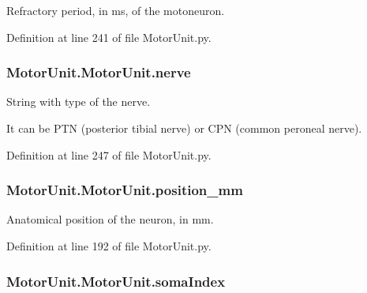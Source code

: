 Refractory period, in ms, of the motoneuron. 



Definition at line 241 of file Motor\+Unit.\+py.

\subsubsection[{\texorpdfstring{nerve}{nerve}}]{\setlength{\rightskip}{0pt plus 5cm}Motor\+Unit.\+Motor\+Unit.\+nerve}\hypertarget{class_motor_unit_1_1_motor_unit_a754ee6b88fc2a09899da9f9b13bfbf59}{}\label{class_motor_unit_1_1_motor_unit_a754ee6b88fc2a09899da9f9b13bfbf59}


String with type of the nerve. 

It can be P\+TN (posterior tibial nerve) or C\+PN (common peroneal nerve). 

Definition at line 247 of file Motor\+Unit.\+py.

\subsubsection[{\texorpdfstring{position\+\_\+mm}{position_mm}}]{\setlength{\rightskip}{0pt plus 5cm}Motor\+Unit.\+Motor\+Unit.\+position\+\_\+mm}\hypertarget{class_motor_unit_1_1_motor_unit_a9b1938bcbaa8c89ef47e0b915ab4cd39}{}\label{class_motor_unit_1_1_motor_unit_a9b1938bcbaa8c89ef47e0b915ab4cd39}


Anatomical position of the neuron, in mm. 



Definition at line 192 of file Motor\+Unit.\+py.

\subsubsection[{\texorpdfstring{soma\+Index}{somaIndex}}]{\setlength{\rightskip}{0pt plus 5cm}Motor\+Unit.\+Motor\+Unit.\+soma\+Index}\hypertarget{class_motor_unit_1_1_motor_unit_a7cd2be92814b5892bdd18dafd824da9f}{}\label{class_motor_unit_1_1_motor_unit_a7cd2be92814b5892bdd18dafd824da9f}


